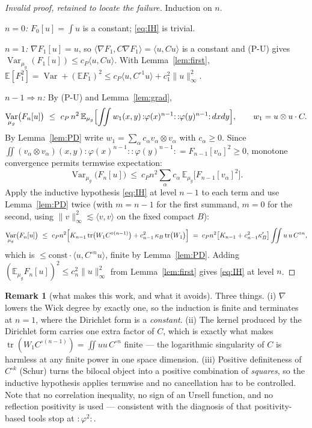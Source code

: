 \documentclass[11pt,a4paper]{article}
\theoremstyle{plain}
\theoremstyle{definition}
\newtheorem{remark}[theorem]{Remark}
\newcommand{\E}{\mathbb{E}}
\newcommand{\ip}[2]{\langle #1,#2\rangle}
\DeclareMathOperator{\Var}{Var}
\DeclareMathOperator{\tr}{tr}
\begin{document}
\begin{proof}[Invalid proof, retained to locate the failure]
Induction on $n$.

\emph{$n=0$:} $F_0[u]=\int u$ is a constant; \eqref{eq:IH} is trivial.

\emph{$n=1$:} $\nabla F_1[u]=u$, so $\ip{\nabla F_1}{C\nabla F_1}=\ip{u}{Cu}$ is a constant and
(P-U) gives $\Var_{\mu_g}(F_1[u])\le c_P\ip{u}{Cu}$. With Lemma~\ref{lem:first},
$\E[F_1^2]=\Var+(\E F_1)^2\le c_P\ip{u}{C^{\circ1}u}+c_1^2\|u\|_\infty^2$.

\emph{$n-1\Rightarrow n$:} By (P-U) and Lemma~\ref{lem:grad},
\[
  \Var_{\mu_g}\bigl(F_n[u]\bigr)\ \le\ c_P\,n^2\,\E_{\mu_g}\Bigl[
  \iint w_1(x,y)\,{:}\varphi(x)^{n-1}{:}\,{:}\varphi(y)^{n-1}{:}\,dxdy\Bigr],
  \qquad w_1=u\otimes u\cdot C .
\]
By Lemma~\ref{lem:PD} write $w_1=\sum_\alpha c_\alpha v_\alpha\otimes v_\alpha$ with
$c_\alpha\ge0$. Since
$\iint (v_\alpha\otimes v_\alpha)(x,y){:}\varphi(x)^{n-1}{:}{:}\varphi(y)^{n-1}{:}
=F_{n-1}[v_\alpha]^2\ge0$, monotone convergence permits termwise expectation:
\[
  \Var_{\mu_g}\bigl(F_n[u]\bigr)\ \le\ c_Pn^2\sum_\alpha c_\alpha\,
  \E_{\mu_g}\bigl[F_{n-1}[v_\alpha]^2\bigr].
\]
Apply the inductive hypothesis \eqref{eq:IH} at level $n-1$ to each term and use
Lemma~\ref{lem:PD} twice (with $m=n-1$ for the first summand, $m=0$ for the second, using
$\|v\|_\infty^2\lesssim\ip{v}{v}$ on the fixed compact $B$):
\[
  \Var_{\mu_g}\bigl(F_n[u]\bigr)\ \le\ c_Pn^2\Bigl[K_{n-1}\tr\bigl(W_1C^{\circ(n-1)}\bigr)
  +c_{n-1}^2\,\kappa_B\tr\bigl(W_1\bigr)\Bigr]
  \;=\;c_Pn^2\bigl[K_{n-1}+c_{n-1}^2\kappa_B'\bigr]\iint u\,u\,C^{\circ n},
\]
which is $\le\text{const}\cdot\ip{u}{C^{\circ n}u}$, finite by Lemma~\ref{lem:PD}. Adding
$(\E_{\mu_g}F_n[u])^2\le c_n^2\|u\|_\infty^2$ from Lemma~\ref{lem:first} gives \eqref{eq:IH} at
level $n$.
\end{proof}

\begin{remark}[what makes this work, and what it avoids]
Three things. (i) $\nabla$ lowers the Wick degree by exactly one, so the induction is finite and
terminates at $n=1$, where the Dirichlet form is a \emph{constant}. (ii) The kernel produced by
the Dirichlet form carries one extra factor of $C$, which is exactly what makes
$\tr(W_1C^{\circ(n-1)})=\iint uu\,C^{\circ n}$ finite --- the logarithmic singularity of $C$ is
harmless at any finite power in one space dimension. (iii) Positive definiteness of $C^{\circ k}$
(Schur) turns the bilocal object into a positive combination of \emph{squares}, so the inductive
hypothesis applies termwise and no cancellation has to be controlled. Note that no correlation
inequality, no sign of an Ursell function, and no reflection positivity is used --- consistent
with the diagnosis of \cite[\S6]{H6} that positivity-based tools stop at ${:}\varphi^2{:}$.
\end{remark}
\end{document}
